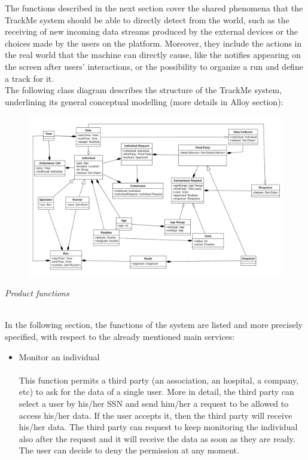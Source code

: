 \documentclass{article}
\begin{document}
\begin{legal}
\begin{legal}
{The functions described in the next section cover the shared phenomena that the TrackMe system should be able to directly detect from the world, such as the receiving of new incoming data streams produced by the external devices or the choices made by the users on the platform. Moreover, they include the actions in the real world that the machine can directly cause, like the notifies appearing on the screen after users' interactions, or the possibility to organize a run and define a track for it. \\
The following class diagram describes the structure of the TrackMe system, underlining its general conceptual modelling (more details in Alloy section): \\
			}
			\begin{figure}[H]
  			\includegraphics[width=\linewidth]{./images/UML1-0.png}
			\end{figure}
		\item \textit{Product functions} \\\\
		{\normalfont
In the following section, the functions of the system are listed and more precisely specified, with
respect to the already mentioned main services:
		\begin{itemize}
		\item Monitor an individual\\\\
		This function permits a third party (an association, an hospital, a company, etc) to ask for the data of a single user. More in detail, the third party can select a user by his/her SSN and send him/her a request to be allowed to access his/her data. If the user accepts it, then the third party will receive his/her data. The third party can request to keep monitoring the individual also after the request and it will receive the data as soon as they are ready. The user can decide to deny the permission at any moment. \\

\end{itemize}}
\end{legal}
\end{legal}
\end{document}
